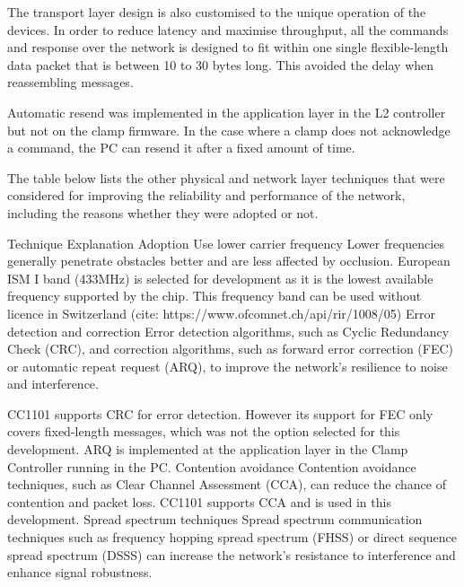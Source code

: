 \begin{itemize}
The transport layer design is also customised to the unique operation of the devices. In order to reduce latency and maximise throughput, all the commands and response over the network is designed to fit within one single flexible-length data packet that is between 10 to 30 bytes long. This avoided the delay when reassembling messages. 

Automatic resend was implemented in the application layer in the L2 controller but not on the clamp firmware. In the case where a clamp does not acknowledge a command, the PC can resend it after a fixed amount of time. 

The table below lists the other physical and network layer techniques that were considered for improving the reliability and performance of the network, including the reasons whether they were adopted or not.

Technique
Explanation
Adoption
Use lower carrier frequency
Lower frequencies generally penetrate obstacles better and are less affected by occlusion.
European ISM I band (433MHz) is selected for development as it is the lowest available frequency supported by the chip. This frequency band can be used without licence in Switzerland (cite: https://www.ofcomnet.ch/api/rir/1008/05)
Error detection and correction
Error detection algorithms, such as Cyclic Redundancy Check (CRC), and correction algorithms, such as forward error correction (FEC) or automatic repeat request (ARQ), to improve the network's resilience to noise and interference.



CC1101 supports CRC for error detection. However its support for FEC only covers fixed-length messages, which was not the option selected for this development. 
ARQ is implemented at the application layer in the Clamp Controller running in the PC.
Contention avoidance
Contention avoidance techniques, such as Clear Channel
Assessment (CCA), can reduce the chance of contention and packet loss. 
CC1101 supports CCA and is used in this development.
Spread spectrum techniques
Spread spectrum communication techniques such as frequency hopping spread spectrum (FHSS) or direct sequence spread spectrum (DSSS) can increase the network's resistance to interference and enhance signal robustness.



\end{itemize}
